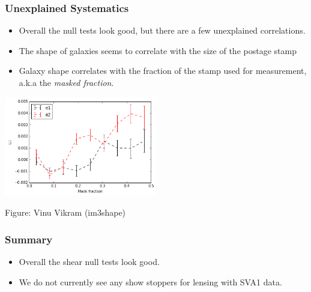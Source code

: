 \documentclass{beamer}
\begin{document}
\frame
{
    \frametitle{Unexplained Systematics}

    \begin{itemize}

        \item Overall the null tests look good, but there are a few unexplained
            correlations.

        \item The shape of galaxies seems to correlate with the size of the
            postage stamp
    
         \item Galaxy shape correlates with the fraction of the stamp used for
             measurement, a.k.a the {\em masked fraction}.
     \end{itemize}

    \begin{center}
        \includegraphics[width=0.5\textwidth]{im3shape-v-vs-mask-frac.png}
    \end{center}

     {\tiny Figure: Vinu Vikram (im3shape)}
}

\frame
{
    \frametitle{Summary}

    \begin{itemize}

        \item Overall the shear null tests look good.

        \item We do not currently see any show stoppers for lensing with SVA1 data.

    \end{itemize}
}
\end{document}
